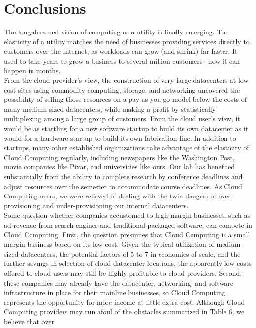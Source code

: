 \chapter{Conclusions}
The long dreamed vision of computing as a utility is finally emerging. The elasticity of a utility matches the need of 
businesses providing services directly to customers over the Internet, as workloads can grow (and shrink) far faster. 
It used to take years to grow a business to several million customers \textendash\ now it can happen in months.\\[0.3cm]
From the cloud provider’s view, the construction of very large datacenters at low cost sites using commodity
computing, storage, and networking uncovered the possibility of selling those resources on a pay-as-you-go model
below the costs of many medium-sized datacenters, while making a profit by statistically multiplexing among a large
group of customers. From the cloud user's view, it would be as startling for a new software startup to build its own
datacenter as it would for a hardware startup to build its own fabrication line. In addition to startups, many other
established organizations take advantage of the elasticity of Cloud Computing regularly, including newspapers like the
Washington Post, movie companies like Pixar, and universities like ours. Our lab has benefited substantially from the
ability to complete research by conference deadlines and adjust resources over the semester to accommodate course
deadlines. As Cloud Computing users, we were relieved of dealing with the twin dangers of over-provisioning and
under-provisioning our internal datacenters.\\[0.3cm]
Some question whether companies accustomed to high-margin businesses, such as ad revenue from search engines
and traditional packaged software, can compete in Cloud Computing. First, the question presumes that Cloud Computing 
is a small margin business based on its low cost. Given the typical utilization of medium-sized datacenters, the
potential factors of 5 to 7 in economies of scale, and the further savings in selection of cloud datacenter locations, the
apparently low costs offered to cloud users may still be highly profitable to cloud providers. Second, these companies
may already have the datacenter, networking, and software infrastructure in place for their mainline businesses, so
Cloud Computing represents the opportunity for more income at little extra cost.
Although Cloud Computing providers may run afoul of the obstacles summarized in Table 6, we believe that over
